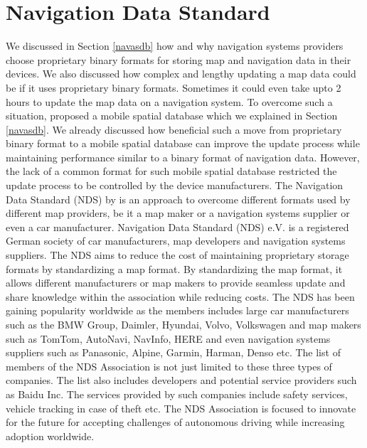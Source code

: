 \section{Navigation Data Standard} \label{nds}
We discussed in Section \ref{navasdb} how and why navigation systems providers choose proprietary binary formats for storing map and navigation data in their devices. 
We also discussed how complex and lengthy updating a map data could be if it uses proprietary binary formats. 
Sometimes it could even take upto 2 hours to update the map data on a navigation system. 
To overcome such a situation, \citet{min2008mobile} proposed a mobile spatial database which we explained in Section \ref{navasdb}. 
We already discussed how beneficial such a move from proprietary binary format to a mobile spatial database can improve the update process while maintaining performance similar to a binary format of navigation data. 
However, the lack of a common format for such mobile spatial database restricted the update process to be controlled by the device manufacturers. 
The Navigation Data Standard (NDS) by \citet{muller2010navigation} is an approach to overcome different formats used by different map providers, be it a map maker or a navigation systems supplier or even a car manufacturer. 
Navigation Data Standard (NDS) e.V. is a registered German society of car manufacturers, map developers and navigation systems suppliers. 
The NDS aims to reduce the cost of maintaining proprietary storage formats by standardizing a map format. 
By standardizing the map format, it allows different manufacturers or map makers to provide seamless update and share knowledge within the association while reducing costs. 
The NDS has been gaining popularity worldwide as the members includes large car manufacturers such as the BMW Group, Daimler, Hyundai, Volvo, Volkswagen and map makers such as TomTom, AutoNavi, NavInfo, HERE and even navigation systems suppliers such as Panasonic, Alpine, Garmin, Harman, Denso etc. 
The list of members of the NDS Association is not just limited to these three types of companies. 
The list also includes developers and potential service providers such as Baidu Inc. The services provided by such companies include safety services, vehicle tracking in case of theft etc.   
The NDS Association is focused to innovate for the future for accepting challenges of autonomous driving while increasing adoption worldwide.\\


